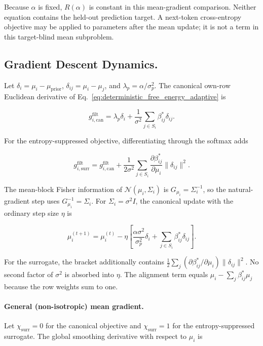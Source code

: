 \documentclass[twoside,11pt]{article}
\begin{document}
Because $\alpha$ is fixed, $R(\alpha)$ is constant in this mean-gradient comparison. Neither equation contains the held-out prediction target. A next-token cross-entropy objective may be applied to parameters after the mean update; it is not a term in this target-blind mean subproblem.

\subsection{Gradient Descent Dynamics.}

Let $\delta_i=\mu_i-\mu_{\mathrm{prior}}$, $\delta_{ij}=\mu_i-\mu_j$, and $\lambda_p=\alpha/\sigma_p^2$. The canonical own-row Euclidean derivative of Eq.~\eqref{eq:deterministic_free_energy_adaptive} is

\begin{equation}
g_{i,\mathrm{can}}^{\mathrm{filt}}
=\lambda_p\delta_i
+\frac{1}{\sigma^2}\sum_{j\in S_i}\beta_{ij}^*\delta_{ij}.
\label{eq:isotropic_canonical_gradient}
\end{equation}

For the entropy-suppressed objective, differentiating through the softmax adds

\begin{equation}
g_{i,\mathrm{surr}}^{\mathrm{filt}}
=g_{i,\mathrm{can}}^{\mathrm{filt}}
+\frac{1}{2\sigma^2}
\sum_{j\in S_i}
\frac{\partial\beta_{ij}^*}{\partial\mu_i}
\|\delta_{ij}\|^2.
\label{eq:isotropic_surrogate_gradient}
\end{equation}

The mean-block Fisher information of $\mathcal{N}(\mu_i,\Sigma_i)$ is $G_{\mu_i}=\Sigma_i^{-1}$, so the natural-gradient step uses $G_{\mu_i}^{-1}=\Sigma_i$. For $\Sigma_i=\sigma^2I$, the canonical update with the ordinary step size $\eta$ is

\begin{equation}
\boxed{
\mu_i^{(t+1)}
=\mu_i^{(t)}
-\eta\left[
\frac{\alpha\sigma^2}{\sigma_p^2}\delta_i
+\sum_{j\in S_i}\beta_{ij}^*\delta_{ij}
\right].
}
\label{eq:isotropic_natural_update}
\end{equation}

For the surrogate, the bracket additionally contains $\frac{1}{2}\sum_j(\partial\beta_{ij}^*/\partial\mu_i)\|\delta_{ij}\|^2$. No second factor of $\sigma^2$ is absorbed into $\eta$. The alignment term equals $\mu_i-\sum_j\beta_{ij}^*\mu_j$ because the row weights sum to one.

\paragraph{General (non-isotropic) mean gradient.}
Let $\chi_{\mathrm{surr}}=0$ for the canonical objective and $\chi_{\mathrm{surr}}=1$ for the entropy-suppressed surrogate. The global smoothing derivative with respect to $\mu_i$ is
\end{document}
